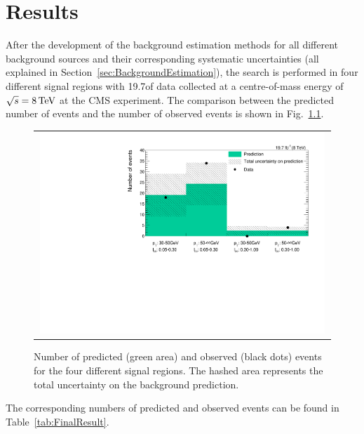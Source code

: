 \chapter{Results}
\label{sec:Results}

After the development of the background estimation methods for all different background sources and their corresponding systematic uncertainties (all explained in Section~\ref{sec:BackgroundEstimation}), 
the search is performed in four different signal regions with 19.7\fbinv of data collected at a centre-of-mass energy of $\sqrt{s} = 8\,\text{Te}\kern-0.06667em\text{V}$ at the CMS experiment.
The comparison between the predicted number of events and the number of observed events is shown in Fig.~\ref{fig:FinalResult}.
\begin{figure}[!b]
  \centering 
  \begin{tabular}{c}
    \includegraphics[width=0.99\textwidth]{figures/analysis/Results/FinalResultPlot.pdf} 
  \end{tabular}
  \caption{Number of predicted (green area) and observed (black dots) events for the four different signal regions. The hashed area represents the total uncertainty on the background prediction.}
  \label{fig:FinalResult}
\end{figure} 
The corresponding numbers of predicted and observed events can be found in Table~\ref{tab:FinalResult}.
